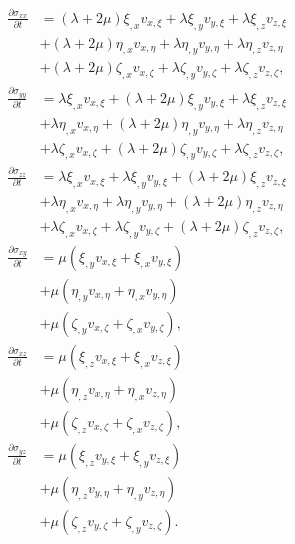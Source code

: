 \begin{align}
	\frac{\partial \sigma_{xx}}{\partial t} & = (\lambda + 2\mu)\xi_{, x} v_{x,\xi} + \lambda \xi_{, y} v_{y,\xi} + \lambda \xi_{, z} v_{z,\xi} \\
	& + (\lambda + 2\mu)\eta_{, x} v_{x,\eta} + \lambda \eta_{, y} v_{y,\eta} + \lambda \eta_{, z} v_{z,\eta} \\
	& + (\lambda + 2\mu)\zeta_{, x} v_{x,\zeta} + \lambda \zeta_{, y} v_{y,\zeta} + \lambda \zeta_{, z} v_{z,\zeta},\\
	\frac{\partial \sigma_{yy}}{\partial t} & = \lambda \xi_{, x} v_{x,\xi} + (\lambda + 2\mu) \xi_{, y} v_{y,\xi} + \lambda \xi_{, z} v_{z,\xi} \\
	& + \lambda \eta_{, x} v_{x,\eta} + (\lambda + 2\mu) \eta_{, y} v_{y,\eta} + \lambda \eta_{, z} v_{z,\eta} \\
	& + \lambda \zeta_{, x} v_{x,\zeta} + (\lambda + 2\mu) \zeta_{, y} v_{y,\zeta} + \lambda \zeta_{, z} v_{z,\zeta},\\
	\frac{\partial \sigma_{zz}}{\partial t} & = \lambda \xi_{, x} v_{x,\xi} + \lambda  \xi_{, y} v_{y,\xi} + (\lambda + 2\mu) \xi_{, z} v_{z,\xi} \\
	& + \lambda \eta_{, x} v_{x,\eta} + \lambda \eta_{, y} v_{y,\eta} + (\lambda + 2\mu) \eta_{, z} v_{z,\eta} \\
	& + \lambda \zeta_{, x} v_{x,\zeta} + \lambda \zeta_{, y} v_{y,\zeta} + (\lambda + 2\mu) \zeta_{, z} v_{z,\zeta},\\
	\frac{\partial \sigma_{xy}}{\partial t} & = \mu(\xi_{,y} v_{x,\xi} + \xi_{,x}v_{y,\xi}) \\
	& + \mu(\eta_{,y} v_{x,\eta} + \eta_{,x}v_{y,\eta}) \\
	& + \mu(\zeta_{,y} v_{x,\zeta} + \zeta_{,x}v_{y,\zeta}), \\
	\frac{\partial \sigma_{xz}}{\partial t} & = \mu(\xi_{,z} v_{x,\xi} + \xi_{,x}v_{z,\xi}) \\
	& + \mu(\eta_{,z} v_{x,\eta} + \eta_{,x}v_{z,\eta}) \\
	& + \mu(\zeta_{,z} v_{x,\zeta} + \zeta_{,x}v_{z,\zeta}), \\
	\frac{\partial \sigma_{yz}}{\partial t} & = \mu(\xi_{,z} v_{y,\xi} + \xi_{,y}v_{z,\xi}) \\
	& + \mu(\eta_{,z} v_{y,\eta} + \eta_{,y}v_{z,\eta}) \\
	& + \mu(\zeta_{,z} v_{y,\zeta} + \zeta_{,y}v_{z,\zeta}).
\end{align}